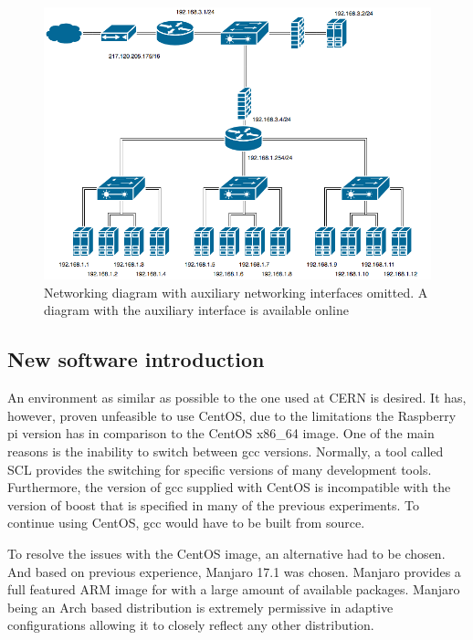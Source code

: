 \documentclass[]{article}
\begin{document}
\begin{center}
	\begin{figure}[H]
		\includegraphics[width=\textwidth]{images/network-primary}
		\caption{Networking diagram with auxiliary networking interfaces omitted. A diagram with the auxiliary interface is available online\cite{Auxiliary_network}}
		\label{fig:ssh}
	\end{figure}
\end{center}

\subsection{New software introduction}
An environment as similar as possible to the one used at CERN is desired. It has, however, proven unfeasible to use CentOS, due to the limitations the Raspberry pi version has in comparison to the CentOS x86\_64 image. One of the main reasons is the inability to switch between gcc versions. Normally, a tool called SCL provides the switching for specific versions of many development tools. Furthermore, the version of gcc supplied with CentOS is incompatible with the version of boost that is specified in many of the previous experiments. To continue using CentOS, gcc would have to be built from source.

To resolve the issues with the CentOS image, an alternative had to be chosen. And based on previous experience, Manjaro 17.1 was chosen. Manjaro provides a full featured ARM image for with a large amount of available packages. Manjaro being an Arch based distribution is extremely permissive in adaptive configurations allowing it to closely reflect any other distribution.
\end{document}
